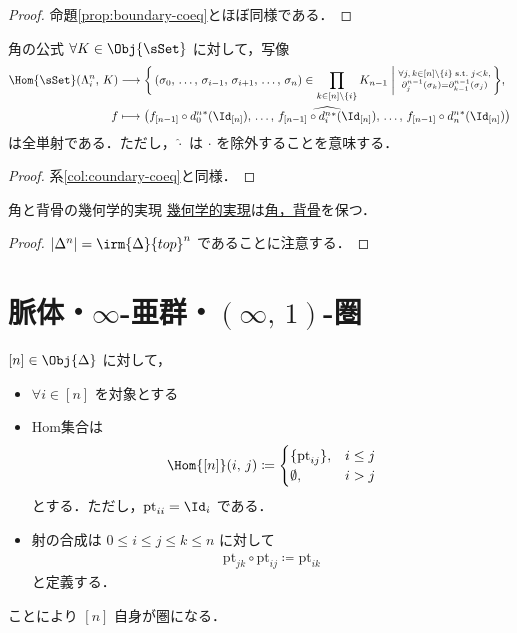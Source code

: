 \documentclass[TQFT_main]{subfiles}
\begin{document}
\begin{proof}
    命題\ref{prop:boundary-coeq}とほぼ同様である．
\end{proof}

\begin{mycol}[label=col:horn-coeq]{角の公式}
    $\forall K \in \Obj{\sSet}$ に対して，写像
    \begin{align}
        \Hom{\sSet} (\Lambda^n_i,\, K) &\lto \biggl\{\, (\sigma_0,\, \dots,\,\sigma_{i-1},\, \sigma_{i+1},\, \dots,\, \sigma_n) \in \prod_{k \in [n] \setminus \{i\}} K_{n-1} \biggm| \substack{\forall j,\, k \in [n] \setminus \{i\}\; \mathrm{s.t.}\;  j < k,\\  \partial^{n-1}_j (\sigma_k) = \partial^{n-1}_{k-1} (\sigma_j)} \,\biggr\}, \\
        f &\lmto \bigl(f_{[n-1]} \circ d^n_0{}^*(\Id_{[n]}),\, \dots,\, \widehat{f_{[n-1]}\circ d^n_{i}{}^*(\Id_{[n]})},\, \dots,\, f_{[n-1]} \circ d^n_n{}^*(\Id_{[n]}) \bigr) 
    \end{align}
    は全単射である．ただし，$\widehat{\cdot}$ は $\cdot$ を除外することを意味する．
\end{mycol}

\begin{proof}
    系\ref{col:coundary-coeq}と同様．
\end{proof}


\begin{myprop}[label=prop:horn-spine-basic]{角と背骨の幾何学的実現}
    \hyperref[def:geometric-realization]{幾何学的実現}は\hyperref[def:horn]{角，背骨}を保つ．
\end{myprop}

\begin{proof}
    $\abs{\Delta^n} = \irm{\Delta}{top}^n$ であることに注意する．
\end{proof}

\section{脈体・$\infty$-亜群・$(\infty,\, 1)$-圏}

$[n] \in \Obj{\Delta}$ に対して，
\begin{itemize}
    \item $\forall i \in [n]$ を対象とする
    \item Hom集合は
    \begin{align}
        \Hom{[n]} (i,\, j)
        \coloneqq
        \begin{cases}
            \{\mathrm{pt}_{ij}\}, &i \le j \\
            \emptyset, &i > j
        \end{cases}
    \end{align}
    とする．ただし，$\mathrm{pt}_{ii} = \Id_i$ である．
    \item 射の合成は $0 \le i \le j \le k \le n$ に対して
    \begin{align}
        \mathrm{pt}_{jk} \circ \mathrm{pt}_{ij} \coloneqq \mathrm{pt}_{ik}
    \end{align}
    と定義する．
\end{itemize}
ことにより $[n]$ 自身が圏になる．
\end{document}
